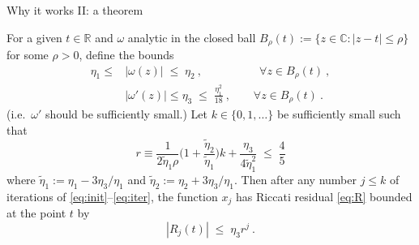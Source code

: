 \documentclass{beamer}
\numberwithin{equation}{theorem}
\begin{document}
\begin{noframe}
    Why it works II: a theorem \\
    \medskip
	\begin{theorem}
		\scriptsize For a given $t \in \mathbb{R}$ and $\omega$ analytic in the closed ball $B_\rho(t) := \{z\in\mathbb{C} : |z-t| \le \rho\}$ for some $\rho>0$, define the bounds 
  \begin{align}\label{eq:ommag}
  \eta_1 \le &|\omega(z)| \;\le\; \eta_2~, \quad \quad \quad \qquad \forall z\in B_\rho(t)~,
   \\
  &|\omega'(z)| \le \eta_3 \;\le\; \frac{\eta_1^2}{18}~,
  \qquad \forall z\in B_\rho(t)~.
  \label{eq:omder}
  \end{align}
  (i.e.\ $\omega'$ should be sufficiently small.)
  Let $k\in\{0,1,\dots\}$ be sufficiently small such that
  \begin{equation}
  r \equiv \frac{1}{2\tilde{\eta}_1 \rho}
  \biggl(1 + \frac{\tilde{\eta}_2}{\tilde{\eta}_1}\biggr) k + \frac{\eta_3}{4\tilde{\eta}_1^2}
  \; \le \; \frac{4}{5}
  \label{eq:r}
  \end{equation}
  where $\tilde{\eta}_1:=\eta_1 - 3\eta_3/\eta_1$ and $\tilde{\eta}_2:=\eta_2 + 3\eta_3/\eta_1$.
  Then after any number $j\le k$ of iterations of \eqref{eq:init}--\eqref{eq:iter},
  the function $x_j$ has Riccati residual \eqref{eq:R} bounded at the point $t$ by
  \begin{equation}
  |R_j(t)| \;\le\; \eta_3 r^j~.
  \end{equation}

	\end{theorem}
\end{noframe}
\end{document}
